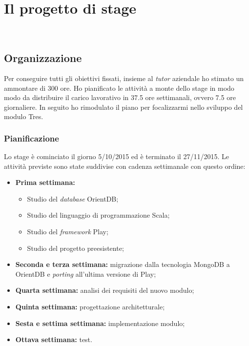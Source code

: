 
\chapter{Il progetto di stage}
\label{cap:il-progetto-di-stage}
\\




\section{Organizzazione}
Per conseguire tutti gli obiettivi fissati, insieme al \emph{tutor} aziendale ho stimato un ammontare di 300 ore. Ho pianificato le attività a monte dello stage in modo modo da distribuire il carico lavorativo in 37.5 ore settimanali, ovvero 7.5 ore giornaliere. In seguito ho rimodulato il piano per focalizzarmi nello sviluppo del modulo Tres.
\subsection{Pianificazione}
Lo stage è cominciato il giorno 5/10/2015 ed è terminato il 27/11/2015. Le attività previste sono state suddivise con cadenza settimanale con questo ordine:
\begin{itemize}
\item \textbf{Prima settimana:}
\begin{itemize}
\item Studio del \emph{database} OrientDB;
\item Studio del linguaggio di programmazione Scala;
\item Studio del \emph{framework} Play;
\item Studio del progetto preesistente;
\end{itemize}
\item \textbf{Seconda e terza settimana:} migrazione dalla tecnologia MongoDB a OrientDB e \emph{porting} all’ultima versione di Play;
\item \textbf{Quarta settimana:} analisi dei requisiti del nuovo modulo;
\item \textbf{Quinta settimana:} progettazione architetturale;
\item \textbf{Sesta e settima settimana:} implementazione modulo;
\item \textbf{Ottava settimana:} test.
\end{itemize} 




